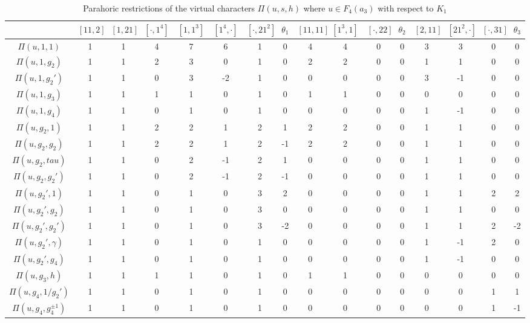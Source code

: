 \begin{landscape}
    \begin{table}[ht]
        \centering
        {\small
        \begin{tabular}{|c|ccc|cccc|cccc|cccc|}
            \hline
            & $[11,2]$ & $[1,21]$ & $[\cdot,1^4]$ & $[1,1^3]$ & $[1^4,\cdot]$ & $[\cdot,21^2]$ & $\theta_1$ & $[11,11]$ & $[1^3,1]$ & $[\cdot,22]$ & $\theta_2$ & $[2,11]$ & $[21^2,\cdot]$ & $[\cdot,31]$ & $\theta_3$ \\\hline
            $\Pi(u,1,1)$ & 1 & 1 & 4 & 7 & 6 & 1 & 0 & 4 & 4 & 0 & 0 & 3 & 3 & 0 & 0 \\
            $\Pi(u,1,g_2)$ & 1 & 1 & 2 & 3 & 0 & 1 & 0 & 2 & 2 & 0 & 0 & 1 & 1 & 0 & 0 \\
            $\Pi(u,1,g_2')$ & 1 & 1 & 0 & 3 & -2 & 1 & 0 & 0 & 0 & 0 & 0 & 3 & -1 & 0 & 0 \\
            $\Pi(u,1,g_3)$ & 1 & 1 & 1 & 1 & 0 & 1 & 0 & 1 & 1 & 0 & 0 & 0 & 0 & 0 & 0 \\
            $\Pi(u,1,g_4)$ & 1 & 1 & 0 & 1 & 0 & 1 & 0 & 0 & 0 & 0 & 0 & 1 & -1 & 0 & 0 \\\hline
            $\Pi(u,g_2,1)$  & 1 & 1 & 2 & 2 & 1 & 2 & 1 & 2 & 2 & 0 & 0 & 1 & 1 & 0 & 0 \\
            $\Pi(u,g_2,g_2)$ & 1 & 1 & 2 & 2 & 1 & 2 & {-1} & 2 & 2 & 0 & 0 & 1 & 1 & 0 & 0 \\
            $\Pi(u,g_2,tau)$ & 1 & 1 & 0 & 2 & {-1} & 2 & 1 & 0 & 0 & 0 & 0 & 1 & 1 & 0 & 0 \\
            $\Pi(u,g_2,g_2')$ & 1 & 1 & 0 & 2 & {-1} & 2 & {-1} & 0 & 0 & 0 & 0 & 1 & 1 & 0 & 0 \\\hline
            $\Pi(u,g_2',1)$ & 1 & 1 & 0 & 1 & 0 & {3} & 2 & 0 & 0 & 0 & 0 & 1 & 1 & 2 & 2 \\
            $\Pi(u,g_2',g_2)$ & 1 & 1 & 0 & 1 & 0 & {3} & 0 & 0 & 0 & 0 & 0 & 1 & 1 & 0 & 0 \\
            $\Pi(u,g_2',g_2')$ & 1 & 1 & 0 & 1 & 0 & {3} & {-2} & 0 & 0 & 0 & 0 & 1 & 1 & 2 & {-2} \\
            $\Pi(u,g_2',\gamma)$ & 1 & 1 & 0 & 1 & 0 & 1 & 0 & 0 & 0 & 0 & 0 & 1 & {-1} & 2 & 0 \\
            $\Pi(u,g_2',g_4)$ & 1 & 1 & 0 & 1 & 0 & 1 & 0 & 0 & 0 & 0 & 0 & 1 & {-1} & 0 & 0 \\\hline
            $\Pi(u,g_3,h)$ & 1 & 1 & 1 & 1 & 0 & 1 & 0 & 1 & 1 & 0 & 0 & 0 & 0 & 0 & 0 \\\hline
            $\Pi(u,g_4,1/g_2')$ & 1 & 1 & 0 & 1 & 0 & 1 & 0 & 0 & 0 & 0 & 0 & 0 & 0 & 1 & 1 \\
            $\Pi(u,g_4,g_4^{\pm1})$ & 1 & 1 & 0 & 1 & 0 & 1 & 0 & 0 & 0 & 0 & 0 & 0 & 0 & 1 & {-1} \\\hline
        \end{tabular}
        }
        \caption{Parahoric restrictions of the virtual characters $\Pi(u,s,h)$ where $u\in F_4(a_3)$ with respect to $K_1$}
    \end{table}


\end{landscape}
